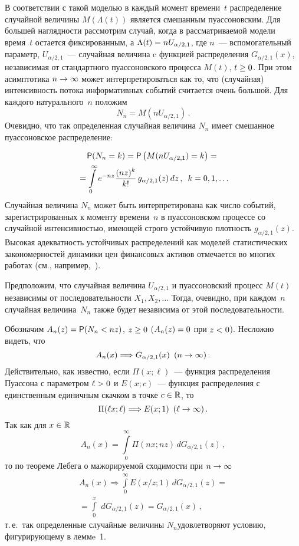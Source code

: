 \begin{multicols}{2}
В соответствии с такой моделью в каждый момент времени~$t$
распределение случайной величины $M(\Lambda(t))$ является смешанным
пуассоновским. Для большей наглядности рассмотрим случай, когда в
рассматриваемой модели время~$t$ остается фиксированным, а
$\Lambda(t)\hm=nU_{\alpha/2,1}$, где $n$~--- вспомогательный параметр,
$U_{\alpha/2,1}$~--- случайная величина c функцией распределения
$G_{\alpha/2,1}(x)$, независимая от стандартного пуассоновского
процесса $M(t)$, $t\hm\ge0$. При этом асимптотика $n\hm\to\infty$ может
интерпретироваться как то, что (случайная) интенсивность потока
информативных событий считается очень большой. Для каждого
натурального~$n$ положим
$$
N_n=M(nU_{\alpha/2,1})\,.
$$
Очевидно, что так определенная случайная величина $N_n$ имеет
смешанное пуассоновское распределение:

\noindent
\begin{multline}
{\sf P}(N_n=k)={\sf P}
\left(M(nU_{\alpha/2,1})=k\right)={}\\
{}=
\int\limits_0^{\infty}e^{-nz}\displaystyle\frac{\displaystyle (nz)^k\mathstrut}{\displaystyle k!\mathstrut}\,g_{\alpha/2,1}(z)\,dz\,,\enskip
k=0,1,\ldots
\label{e3-kor}
\end{multline}
Случайная величина $N_n$ может быть интер\-пре\-ти\-рована как число
событий, зарегистрированных к моменту времени~$n$ в пуассоновском
процессе со случайной интенсивностью, имеющей строго устойчивую
плотность $g_{\alpha/2,1}(z)$. Высокая адекватность устойчивых
распределений как моделей статистических закономерностей динамики
цен финансовых активов отмечается во многих работах (см., например,~\cite{McCulloch1996}).

Предположим, что случайная величина $U_{\alpha/2,1}$ и пуассоновский
процесс $M(t)$ независимы от последовательности $X_1,X_2,\ldots$
Тогда, очевидно, при каждом~$n$ случайная величина~$N_n$ также будет
независима от этой последовательности.

Обозначим $A_n(z)={\sf P}(N_n<nz)$, $z\hm\ge0$ ($A_n(z)\hm=0$ при $z\hm<0$).
Несложно видеть, что
$$
A_n(x)\Longrightarrow G_{\alpha/2,1}(x)\enskip (n\to\infty)\,.
$$
Действительно, как известно, если $\Pi(x;\ell)$~--- функция
распределения Пуассона с параметром $\ell\hm>0$ и $E(x;c)$~--- функция
распределения с единственным единичным скачком в точке $c\hm\in\r$, то
$$
\Pi(\ell x;\ell)\Longrightarrow E(x;1)\enskip (\ell\to\infty)\,.
$$
Так как для $x\in\mathbb{R}$
$$
A_n(x)=\int\limits_{0}^{\infty}\Pi(n x; n z)\,dG_{\alpha/2,1}(z)\,,
$$
то по теореме Лебега о мажорируемой сходимости при $n\hm\to\infty$
\begin{multline*}
A_n(x)\Longrightarrow\int\limits_{0}^{\infty}E(x/z;1)\,dG_{\alpha/2,1}(z)={}\\
{}=
\int\limits_{0}^{x}\,\,dG_{\alpha/2,1}(z)=G_{\alpha/2,1}(x)\,,
\end{multline*}
т.\,е.\ так определенные случайные величины $N_n$\linebreak удовлетворяют
условию, фигурирующему в леммe~1.


\end{multicols}
